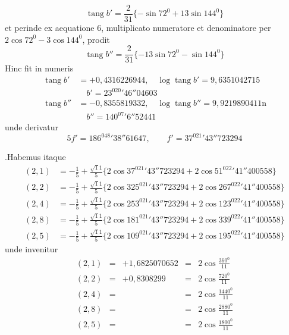 %
\[
\operatorname{tang}b'=\frac2{31}\{-\sin72^0+13\sin144^0\}
\]
et perinde ex aequatione $6$, multiplicato numeratore et denominatore per $2\cos72^0-3\cos144^0$, prodit
\[
\operatorname{tang}b''=\frac2{31}\{-13\sin72^0-\sin144^0\}
\]
Hinc fit in numeris
\[
\begin{aligned}
\operatorname{tang}b'&=+0{,}4316226944,\quad\log\operatorname{tang}b'=9{,}6351042715\\
&\hspace{1em}b'=23^020'46''04603\\
\operatorname{tang}b''&=-0{,}8355819332,\quad\log\operatorname{tang}b''=9{,}9219890411\mathrm n\\
&\hspace{1em}b''=140^07'6''52441
\end{aligned}
\]
unde derivatur
\[
5f'=186^048'38''61647,\qquad f'=37^021'43''723294
\]

.Habemus itaque
\[
\begin{aligned}
(2,1)&=-\frac15+\frac{\surd11}5\{2\cos37^021'43''723294+2\cos51^022'41''400558\}\\
(2,2)&=-\frac15+\frac{\surd11}5\{2\cos325^021'43''723294+2\cos267^022'41''400558\}\\
(2,4)&=-\frac15+\frac{\surd11}5\{2\cos253^021'43''723294+2\cos123^022'41''400558\}\\
(2,8)&=-\frac15+\frac{\surd11}5\{2\cos181^021'43''723294+2\cos339^022'41''400558\}\\
(2,5)&=-\frac15+\frac{\surd11}5\{2\cos109^021'43''723294+2\cos195^022'41''400558\}
\end{aligned}
\]
unde invenitur
\[
\begin{array}{rclcl}
(2,1)&=&+1{,}6825070652&=&2\cos\frac{360^0}{11}\\[3pt]
(2,2)&=&+0{,}8308299&=&2\cos\frac{720^0}{11}\\[3pt]
(2,4)&=&&=&2\cos\frac{1440^0}{11}\\[3pt]
(2,8)&=&&=&2\cos\frac{2880^0}{11}\\[3pt]
(2,5)&=&&=&2\cos\frac{1800^0}{11}
\end{array}
\]

